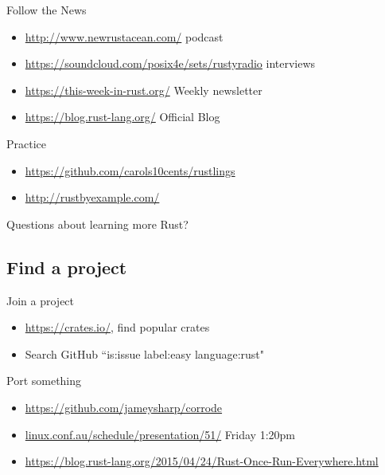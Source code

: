\documentclass[aspectratio=169]{beamer}
\begin{document}
\begin{frame}
    Follow the News
    \begin{itemize}
        \item \url{http://www.newrustacean.com/} podcast
        \item \url{https://soundcloud.com/posix4e/sets/rustyradio} interviews
        \item \url{https://this-week-in-rust.org/} Weekly newsletter
        \item \url{https://blog.rust-lang.org/} Official Blog
    \end{itemize}
\end{frame}

\begin{frame}
    Practice
    \begin{itemize}
        \item \url{https://github.com/carols10cents/rustlings}
        \item \url{http://rustbyexample.com/}
    \end{itemize}
\end{frame}

\begin{frame}
    \hfill Questions about learning more Rust?
\end{frame}


\subsection{Find a project}

\begin{frame}
    Join a project
    \begin{itemize}
        \item \url{https://crates.io/}, find popular crates
        \item Search GitHub ``is:issue label:easy language:rust"
    \end{itemize}
\end{frame}

\begin{frame}
    Port something
    \begin{itemize}
        \item \url{https://github.com/jameysharp/corrode}
        \item \url{linux.conf.au/schedule/presentation/51/} Friday 1:20pm
        \item \url{https://blog.rust-lang.org/2015/04/24/Rust-Once-Run-Everywhere.html}
    \end{itemize}
\end{frame}
\end{document}
